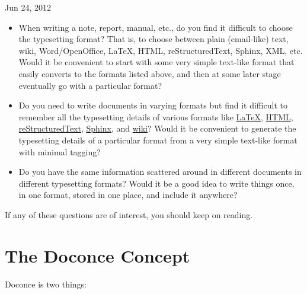 \documentclass{book}
\begin{document}

\begin{center}
Jun 24, 2012
\end{center}


\begin{itemize}
 \item When writing a note, report, manual, etc., do you find it difficult
   to choose the typesetting format? That is, to choose between plain
   (email-like) text, wiki, Word/OpenOffice, {\LaTeX}, HTML,
   reStructuredText, Sphinx, XML, etc.  Would it be convenient to
   start with some very simple text-like format that easily converts
   to the formats listed above, and then at some later stage
   eventually go with a particular format?

 \item Do you need to write documents in varying formats but find it
   difficult to remember all the typesetting details of various
   formats like \href{{http://refcards.com/docs/silvermanj/amslatex/LaTeXRefCard.v2.0.pdf}}{LaTeX}, \href{{http://www.htmlcodetutorial.com/}}{HTML}, \href{{http://docutils.sourceforge.net/docs/ref/rst/restructuredtext.html}}{reStructuredText}, \href{{http://sphinx.pocoo.org/contents.html}}{Sphinx}, and \href{{http://code.google.com/p/support/wiki/WikiSyntax}}{wiki}? Would it be convenient
   to generate the typesetting details of a particular format from a
   very simple text-like format with minimal tagging?

 \item Do you have the same information scattered around in different
   documents in different typesetting formats? Would it be a good idea
   to write things once, in one format, stored in one place, and
   include it anywhere?
\end{itemize}

\noindent
If any of these questions are of interest, you should keep on reading.


\section{The Doconce Concept}

Doconce is two things:
\end{document}
